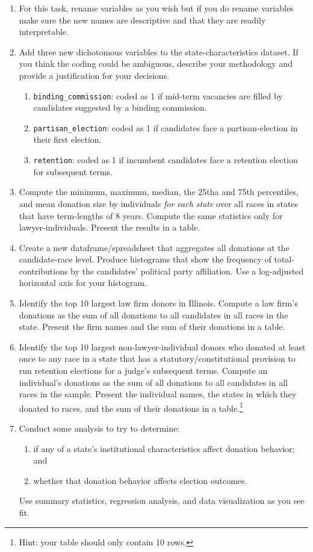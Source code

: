 \documentclass[11pt, letterpaper, twoside]{article}
\begin{document}
\begin{enumerate}
    \item For this task, rename variables as you wish but if you do rename variables make sure the new names are descriptive and that they are readily interpretable. 
    \item Add three new dichotomous variables to the state-characteristics dataset. If you think the coding could be ambiguous, describe your methodology and provide a justification for your decisions.
    \begin{enumerate}[label=\alph*.]
        \item \verb|binding_commission|: coded as 1 if mid-term vacancies are filled by candidates suggested by a binding commission.
        \item \verb|partisan_election|: coded as 1 if candidates face a partisan-election in their first election. 
        \item \verb|retention|: coded as 1 if incumbent candidates face a retention election for subsequent terms.
    \end{enumerate}
    \item Compute the minimum, maximum, median, the 25tha and 75th percentiles, and mean donation size by individuals \textit{for each state} over all races in states that have term-lengths of 8 years. Compute the same statistics only for lawyer-individuals. Present the results in a table. 
    \item Create a new dataframe/spreadsheet that aggregates all donations at the candidate-race level. Produce histograms that show the frequency of total-contributions by the candidates' political party affiliation. Use a log-adjusted horizontal axis for your histogram.
    \item Identify the top 10 largest law firm donors in Illinois. Compute a law firm's donations as the sum of all donations to all candidates in all races in the state. Present the firm names and the sum of their donations in a table.
    \item Identify the top 10 largest non-lawyer-individual donors who donated at least once to any race in a state that has a statutory/constitutional provision to run retention elections for a judge's subsequent terms. Compute an individual's donations as the sum of all donations to all candidates in all races in the sample. Present the individual names, the states in which they donated to races, and the sum of their donations in a table.\footnote{Hint: your table should only contain 10 rows.} 
    \item Conduct some analysis to try to determine:
    \begin{enumerate}[label=\alph*.]
        \item if any of a state's institutional characteristics affect donation behavior; and 
        \item whether that donation behavior affects election outcomes.
    \end{enumerate}
    Use summary statistics, regression analysis, and data visualization as you see fit.
\end{enumerate}
\end{document}
